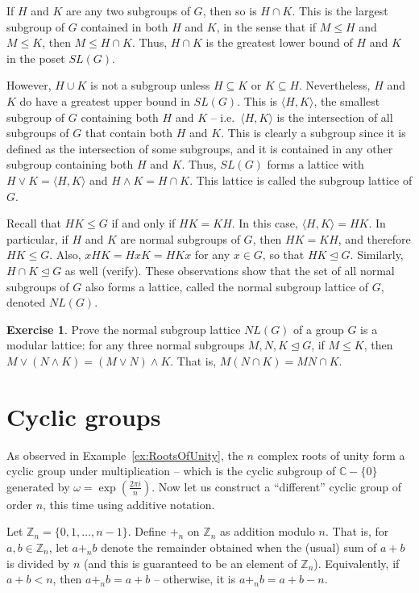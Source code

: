 \documentclass[svgnames]{article}
\theoremstyle{definition}
\newtheorem{Exercise}{Exercise}[section]
\theoremstyle{remark}
\newcommand{\newterm}[1]{{\color{alertcolor} #1}}
\begin{document}
\begin{appendices}
If $H$ and $K$ are any two subgroups of $G$, then so is $H \cap K$. This is the largest subgroup of $G$ contained in both $H$ and $K$, in the sense that if $M \le H$ and $M \le K$, then $M \le H \cap K$. Thus, $H \cap K$ is the greatest lower bound of $H$ and $K$ in the poset $SL(G)$.

\label{def:Join} However, $H \cup K$ is not a subgroup unless $H \subseteq K$ or $K \subseteq H$. Nevertheless, $H$ and $K$ do have a greatest upper bound in $SL(G)$. This is $\langle H, K \rangle$, the smallest subgroup of $G$ containing both $H$ and $K$ -- i.e.\ $\langle H, K \rangle$ is the intersection of all subgroups of $G$ that contain both $H$ and $K$. This is clearly a subgroup since it is defined as the intersection of some subgroups, and it is contained in any other subgroup containing both $H$ and $K$. Thus, $SL(G)$ forms a lattice with $H \vee K = \langle H, K \rangle$ and $H \wedge K = H \cap K$. This lattice is called the \newterm{subgroup lattice} of $G$.

\label{def:NL(G)}Recall that $HK \le G$ if and only if $HK = KH$. In this case, $\langle H, K \rangle = HK$. In particular, if $H$ and $K$ are normal subgroups of $G$, then $HK = KH$, and therefore $HK \le G$. Also, $xHK = HxK = HKx$ for any $x \in G$, so that $HK \unlhd G$. Similarly, $H \cap K \unlhd G$ as well {\small (verify)}. These observations show that the set of all normal subgroups of $G$ also forms a lattice, called the \newterm{normal subgroup lattice} of $G$, denoted $NL(G)$.
\begin{Exercise}
Prove the normal subgroup lattice $NL(G)$ of a group $G$ is a \newterm{modular lattice}: for any three normal subgroups $M, N, K \unlhd G$, if $M \le K$, then $M \vee (N \wedge K) = (M \vee N) \wedge K$. That is, $M(N \cap K) = MN \cap K$.
\end{Exercise}

\section{Cyclic groups}\label{sec:CycGroups}
As observed in Example~\ref{ex:RootsOfUnity}, the $n$ complex roots of unity form a cyclic group under multiplication -- which is the cyclic subgroup of $\mathbb C - \{0\}$ generated by $\omega = \exp(\frac{2\pi i}{n})$. Now let us construct a ``different'' cyclic group of order $n$, this time using additive notation.

\label{def:Zn} Let $\mathbb Z_n = \{0, 1, \ldots, n - 1\}$. Define $+_n$ on $\mathbb Z_n$ as addition \newterm{modulo $n$}. That is, for $a, b \in \mathbb Z_n$, let $a +_n b$ denote the remainder obtained when the (usual) sum of $a + b$ is divided by $n$ (and this is guaranteed to be an element of $\mathbb Z_n$). Equivalently, if $a + b < n$, then $a +_n b = a + b$  -- otherwise, it is $a +_n b = a + b - n$.


\end{appendices}
\end{document}

